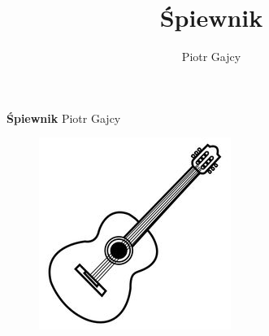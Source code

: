 \documentclass{article}
\title{Śpiewnik}
\author{Piotr Gajcy}
\begin{document}
  
\begin{titlepage}
   \begin{center}
	\Huge
    \vspace*{1cm}
    \textbf{Śpiewnik \newline}
    \vspace{2cm}
    \Large
    Piotr Gajcy          
    \vspace{1.5cm}
    \begin{figure}[h]
    \centering
	 \includegraphics[scale=0.6]{guitar}
	\end{figure}
    \vfill
   \end{center}
   \footnotesize
\end{titlepage}
  
\newpage
\thispagestyle{empty}
\mbox{}
\vspace*{\fill} \newline
{}  \newline
{} 
\newpage
\tableofcontents
{}
\newpage
\setcounter{page}{1}
\end{document}
